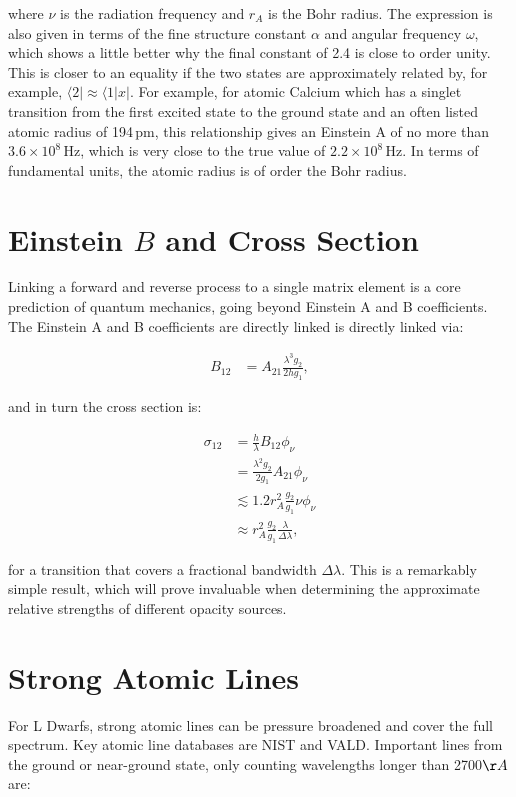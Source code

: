\documentclass[12pt]{article}
\begin{document}
where $\nu$ is the radiation frequency and $r_A$ is the Bohr radius. The expression is also given in terms of the fine structure constant $\alpha$ and angular frequency $\omega$, which shows a little better why the final constant of 2.4 is close to order unity. This is closer to an equality if the two states are approximately related by, for example, $\langle 2| \approx \langle 1| x|$. For example, for atomic Calcium which has a singlet transition from the first excited state to the ground state and an often listed atomic radius of 194\,pm, this relationship gives an Einstein A of no more than $3.6\times 10^{8}$\,Hz, which is very close to the true value of $2.2\times 10^8$\,Hz. In terms of fundamental units, the atomic radius is of order the Bohr radius.

\section{Einstein $B$ and Cross Section}

Linking a forward and reverse process to a single matrix element is a core prediction of quantum mechanics, going beyond Einstein A and B coefficients. The Einstein A and B coefficients are directly linked  is directly linked via:

\begin{align}
B_{12} &= A_{21} \frac{\lambda^3 g_2}{2h g_1},
\end{align}

and in turn the cross section is:

\begin{align}
\sigma_{12} &= \frac{h}{\lambda} B_{12} \phi_\nu \\
&= \frac{\lambda^2 g_2}{2 g_1} A_{21} \phi_\nu \\
&\lesssim 1.2 r_A^2 \frac{g_2}{g_1} \nu \phi_\nu \\
&\approx r_A^2 \frac{g_2}{g_1} \frac{\lambda}{\Delta \lambda},
\end{align}

for a transition that covers a fractional bandwidth $\Delta \lambda$. This is a remarkably simple result, which will prove invaluable when determining the approximate relative strengths of different opacity sources.

\section{Strong Atomic Lines}

For L Dwarfs, strong atomic lines can be pressure broadened and cover the full spectrum. Key atomic line databases are NIST and VALD. Important lines from the ground or near-ground state, only counting wavelengths longer than 2700$\AA$ are:
\end{document}
